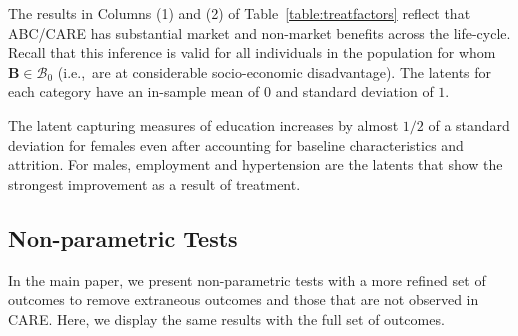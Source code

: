 The results in  Columns (1) and (2) of Table~\ref{table:treatfactors} reflect that ABC/CARE has substantial market and non-market benefits across the life-cycle. Recall that this inference is valid for all individuals in the population for whom $\bm{B} \in \mathcal{B}_0$ (i.e.,\ are at considerable socio-economic disadvantage). The latents for each category have an in-sample mean of $0$ and standard deviation of $1$. 

The latent capturing measures of education increases by almost $1/2$ of a standard deviation for females even after accounting for baseline characteristics and attrition. For males, employment and hypertension are the latents that show the strongest improvement as a result of treatment. 

\doublespacing

\clearpage

\subsection{Non-parametric Tests}\label{app:subsection-nonparametric-tests}

In the main paper, we present non-parametric tests with a more refined set of outcomes to remove extraneous outcomes and those that are not observed in CARE. Here, we display the same results with the full set of outcomes. 

